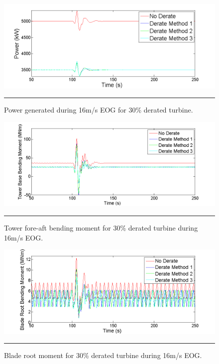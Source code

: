 \begin{figure}[htbp]
	\centering
		\includegraphics[trim = {1cm 0 2cm 0}, clip, width = \linewidth]{Figures/ch4Figures/fig4-1.png}
		\rule{35em}{0.5pt}
	\caption{Power generated during 16m/s EOG for 30\% derated turbine.}
	\label{fig4-1}
\end{figure}

\begin{figure}[htbp]
	\centering
		\includegraphics[trim = {1cm 0 2cm 0}, clip, width = \linewidth]{Figures/ch4Figures/fig4-2.png}
		\rule{35em}{0.5pt}
	\caption{Tower fore-aft bending moment for 30\% derated turbine during 16m/s EOG.}
	\label{fig4-2}
\end{figure}

\begin{figure}[htbp]
	\centering
		\includegraphics[trim = {1cm 0 2cm 0}, clip, width = \linewidth]{Figures/ch4Figures/fig4-3.png}
		\rule{35em}{0.5pt}
	\caption{Blade root moment for 30\% derated turbine during 16m/s EOG.}
	\label{fig4-3}
\end{figure}

